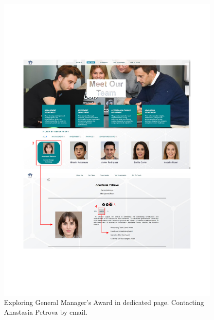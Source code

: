\documentclass[../../DD.tex]{subfiles}
\begin{document}
            \begin{figure}[!htb]
                \centering
                \includegraphics[width=\textwidth]{Images/scenarios/use cases 3.pdf}
                \caption{Exploring General Manager's Award in dedicated page. Contacting Anastasia Petrova by email.}
                \label{fig:use_cases_3_3}
            \end{figure}
\end{document}
